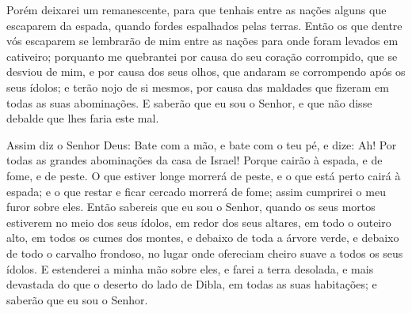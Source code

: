 Porém deixarei um remanescente, para que tenhais entre as nações
alguns que escaparem da espada, quando fordes espalhados pelas
terras. Então os que dentre vós escaparem se lembrarão de mim
entre as nações para onde foram levados em cativeiro; porquanto me
quebrantei por causa do seu coração corrompido, que se desviou de
mim, e por causa dos seus olhos, que andaram se corrompendo após os
seus ídolos; e terão nojo de si mesmos, por causa das maldades que
fizeram em todas as suas abominações. E saberão que eu sou o
Senhor, e que não disse debalde que lhes faria este mal.

Assim diz o Senhor Deus: Bate com a mão, e bate com o teu pé, e
dize: Ah! Por todas as grandes abominações da casa de Israel! Porque
cairão à espada, e de fome, e de peste. O que estiver longe
morrerá de peste, e o que está perto cairá à espada; e o que restar
e ficar cercado morrerá de fome; assim cumprirei o meu furor sobre
eles. Então sabereis que eu sou o Senhor, quando os seus
mortos estiverem no meio dos seus ídolos, em redor dos seus altares,
em todo o outeiro alto, em todos os cumes dos montes, e debaixo de
toda a árvore verde, e debaixo de todo o carvalho frondoso, no lugar
onde ofereciam cheiro suave a todos os seus ídolos. E
estenderei a minha mão sobre eles, e farei a terra desolada, e mais
devastada do que o deserto do lado de Dibla, em todas as suas
habitações; e saberão que eu sou o Senhor.

\medskip

